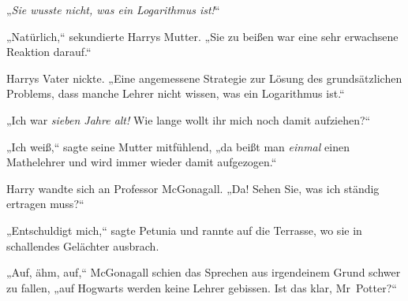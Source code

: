 „\emph{Sie wusste nicht, was ein Logarithmus ist!}“

„Natürlich,“ sekundierte Harrys Mutter. „Sie zu beißen war eine sehr erwachsene Reaktion darauf.“

Harrys Vater nickte. „Eine angemessene Strategie zur Lösung des grundsätzlichen Problems, dass manche Lehrer nicht wissen, was ein Logarithmus ist.“

„Ich war \emph{sieben Jahre alt!} Wie lange wollt ihr mich noch damit aufziehen?“

„Ich weiß,“ sagte seine Mutter mitfühlend, „da beißt man \emph{einmal} einen Mathelehrer und wird immer wieder damit aufgezogen.“

Harry wandte sich an Professor McGonagall. „Da! Sehen Sie, was ich ständig ertragen muss?“

„Entschuldigt mich,“ sagte Petunia und rannte auf die Terrasse, wo sie in schallendes Gelächter ausbrach.

„Auf, ähm, auf,“ McGonagall schien das Sprechen aus irgendeinem Grund schwer zu fallen, „auf Hogwarts werden keine Lehrer gebissen. Ist das klar, Mr~Potter?“

